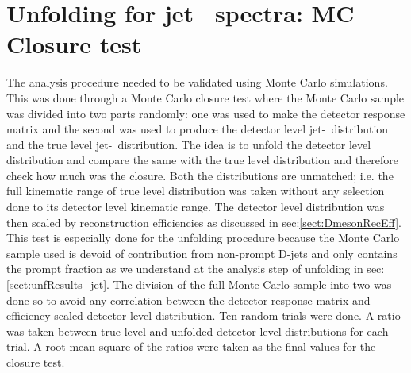 \section{Unfolding for jet \pt\ spectra: MC Closure test}
\label{sect:unfResults_jetClosure}
The analysis procedure needed to be validated using Monte Carlo simulations. This was done through a Monte Carlo closure test where the Monte Carlo sample was divided into two parts randomly: one was used to make the detector response matrix and the second was used to produce the detector level jet-\pt\ distribution and the true level jet-\pt\ distribution. The idea is to unfold the detector level distribution and compare the same with the true level distribution and therefore check how much was the closure. Both the distributions are unmatched; i.e. the full kinematic range of true level distribution was taken without any selection done to its detector level kinematic range. The detector level distribution was then scaled by reconstruction efficiencies as discussed in sec:\ref{sect:DmesonRecEff}. This test is especially done for the unfolding procedure because the Monte Carlo sample used is devoid of contribution from non-prompt D-jets and only contains the prompt fraction as we understand at the analysis step of unfolding in sec:\ref{sect:unfResults_jet}. The division of the full Monte Carlo sample into two was done so to avoid any correlation between the detector response matrix and efficiency scaled detector level distribution. Ten random trials were done. A ratio was taken between true level and unfolded detector level distributions for each trial. A root mean square of the ratios were taken as the final values for the closure test.


